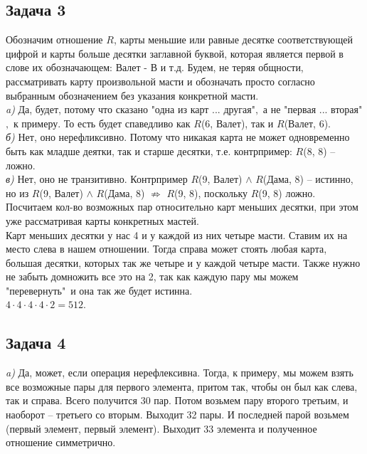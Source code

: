 	\subsection{Задача 3} 
	Обозначим отношение $R$, карты меньшие или равные десятке соответствующей цифрой и  карты больше десятки заглавной буквой, которая является первой в слове их обозначающем: Валет - В и т.д. Будем, не теряя общности, рассматривать карту произвольной масти и обозначать просто согласно выбранным обозначением без указания конкретной масти.\\
	\textit{a)} Да, будет, потому что сказано "одна из карт ... другая"$,$ а не "первая ... вторая"$,$ к примеру. То есть будет спаведливо как $R$(6, Валет), так и $R$(Валет, 6). \\
	\textit{б)} Нет, оно нерефликсивно. Потому что никакая карта не может одновременно быть как младше деятки, так и старше десятки, т.е. контрпример: $R$(8, 8) -- ложно. \\
	\textit{в)} Нет, оно не транзитивно. Контрпример $R$(9, Валет) $\land$ $R$(Дама, 8) -- истинно, но из $R$(9, Валет) $\land$ $R$(Дама, 8) $\not\Rightarrow$ $R$(9, 8), поскольку $R$(9, 8) ложно.\\
	Посчитаем кол-во возможных пар относительно карт меньших десятки, при этом уже рассматривая карты конкретных мастей. \\
	Карт меньших десятки у нас 4 и у каждой из них четыре масти. Ставим их на место слева в нашем отношении. Тогда справа может стоять любая карта, большая десятки, которых так же четыре и у каждой четыре масти. Также нужно не забыть домножить все это на 2, так как каждую пару мы можем "перевернуть"\ и она так же будет истинна. \\
	$4 \cdot 4 \cdot 4 \cdot 4 \cdot 2 = 512$.
	\subsection{Задача 4} 
	\textit{a)} Да, может, если операция нерефлексивна. Тогда, к примеру, мы можем взять все возможные пары для первого элемента, притом так, чтобы он был как слева, так и справа. Всего получится 30 пар. Потом возьмем пару второго третьим, и наоборот -- третьего со вторым. Выходит 32 пары. И последней парой возьмем (первый элемент, первый элемент). Выходит 33 элемента и полученное отношение симметрично. \\
	
